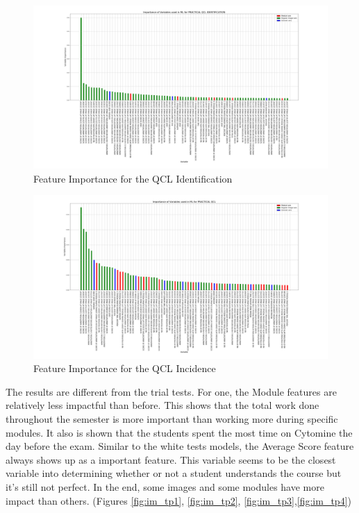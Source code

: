\documentclass[a4paper,11pt]{report}
\numberwithin{figure}{section} %
\begin{document}
      \begin{figure}[H]
      \centering
      \includegraphics[width=.95\linewidth]{var_importance_PRACTICAL_QCL_IDENTIFICATION_2018-04-29_14_34_11.png}
      \caption{Feature Importance for the QCL Identification}
      \label{fig:var_tp3}
      \end{figure}
      
      \begin{figure}[H]
      \centering
      \includegraphics[width=.95\linewidth]{var_importance_PRACTICAL_QCL_2018-04-29_14_33_44.png}
      \caption{Feature Importance for the QCL Incidence}
      \label{fig:var_tp4}
      \end{figure}

The results are different from the trial tests. For one, the Module features are relatively less impactful than before. This shows that the total work done throughout the semester is more important than working more during specific modules. It also is shown that the students spent the most time on Cytomine the day before the exam.%
Similar to the white tests models, the Average Score feature always shows up as a important feature. This variable seems to be the closest variable into determining whether or not a student understands the course but it's still not perfect. In the end, some images and some modules have more impact than others.  (Figures \ref{fig:im_tp1}, \ref{fig:im_tp2}, \ref{fig:im_tp3},\ref{fig:im_tp4})
\end{document}
